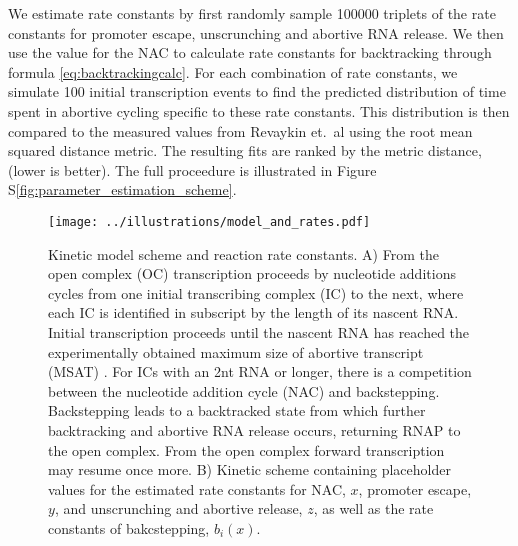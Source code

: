 We estimate rate constants by first randomly sample 100000 triplets of the rate
constants for promoter escape, unscrunching and abortive RNA release. We then
use the value for the NAC to calculate rate constants for backtracking through
formula \eqref{eq:backtrackingcalc}. For each combination of rate constants,
we simulate 100 initial transcription events to find the predicted
distribution of time spent in abortive cycling specific to these rate
constants. This distribution is then compared to the measured values from
Revaykin et.\ al \cite{revyakin_abortive_2006} using the root mean squared
distance metric.  The resulting fits are ranked by the metric distance, (lower
is better). The full proceedure is illustrated in Figure
S\ref{fig:parameter_estimation_scheme}.

\begin{figure}
	\begin{center}
        \texttt{[image: ../illustrations/model\_and\_rates.pdf]}
	\end{center}
    \caption{Kinetic model scheme and reaction rate constants. A) From the
    open complex (OC) transcription proceeds by nucleotide additions cycles
    from one initial transcribing complex (IC) to the next, where each IC is
    identified in subscript by the length of its nascent RNA. Initial
    transcription proceeds until the nascent RNA has reached the
    experimentally obtained maximum size of abortive transcript (MSAT)
    \cite{hsu_initial_2006}. For ICs with an 2nt RNA or longer, there is a
    competition between the nucleotide addition cycle (NAC) and backstepping.
    Backstepping leads to a backtracked state from which further backtracking
    and abortive RNA release occurs, returning RNAP to the open complex. From
    the open complex forward transcription may resume once more. B) Kinetic
    scheme containing placeholder values for the estimated rate constants for
    NAC, $x$, promoter escape, $y$, and unscrunching and abortive release, $z$,
    as well as the rate constants of bakcstepping, $b_i(x)$.}
    \label{fig:model_and_rates}
\end{figure}

